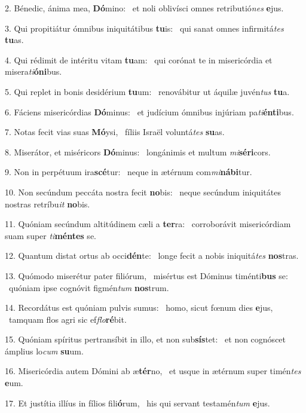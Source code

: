 2. Bénedic, ánima mea, \textbf{Dó}mino: \ast\  et noli oblivísci omnes retributió\textit{nes} \textbf{e}jus.\

3. Qui propitiátur ómnibus iniquitátibus \textbf{tu}is: \ast\  qui sanat omnes infirmitá\textit{tes} \textbf{tu}as.\

4. Qui rédimit de intéritu vitam \textbf{tu}am: \ast\  qui corónat te in misericórdia et misera\textit{ti}\textbf{ó}\textbf{ni}bus.\

5. Qui replet in bonis desidérium \textbf{tu}um: \ast\  renovábitur ut áquilæ juvén\textit{tus} \textbf{tu}a.\

6. Fáciens misericórdias \textbf{Dó}minus: \ast\  et judícium ómnibus injúriam pa\textit{ti}\textbf{én}\textbf{ti}bus.\

7. Notas fecit vias suas \textbf{Mó}ysi, \ast\  fíliis Israël voluntá\textit{tes} \textbf{su}as.\

8. Miserátor, et miséricors \textbf{Dó}minus: \ast\  longánimis et multum \textit{mi}\textbf{sé}\textbf{ri}cors.\

9. Non in perpétuum ira\textbf{scé}tur: \ast\  neque in ætérnum com\textit{mi}\textbf{ná}\textbf{bi}tur.\

10. Non secúndum peccáta nostra fecit \textbf{no}bis: \ast\  neque secúndum iniquitátes nostras retríbu\textit{it} \textbf{no}bis.\

11. Quóniam secúndum altitúdinem cæli a \textbf{ter}ra: \ast\  corroborávit misericórdiam suam super \textit{ti}\textbf{mén}\textbf{tes} se.\

12. Quantum distat ortus ab occi\textbf{dén}te: \ast\  longe fecit a nobis iniquitá\textit{tes} \textbf{nos}tras.\

13. Quómodo miserétur pater filiórum, \dag\  misértus est Dóminus timénti\textbf{bus} se: \ast\  quóniam ipse cognóvit figmén\textit{tum} \textbf{nos}trum.\

14. Recordátus est quóniam pulvis sumus: \dag\  homo, sicut fœnum dies \textbf{e}jus, \ast\  tamquam flos agri sic ef\textit{flo}\textbf{ré}bit.\

15. Quóniam spíritus pertransíbit in illo, et non sub\textbf{sís}tet: \ast\  et non cognóscet ámplius lo\textit{cum} \textbf{su}um.\

16. Misericórdia autem Dómini ab æ\textbf{tér}no, \ast\  et usque in ætérnum super timén\textit{tes} \textbf{e}um.\

17. Et justítia illíus in fílios fili\textbf{ó}rum, \ast\  his qui servant testamén\textit{tum} \textbf{e}jus.\

